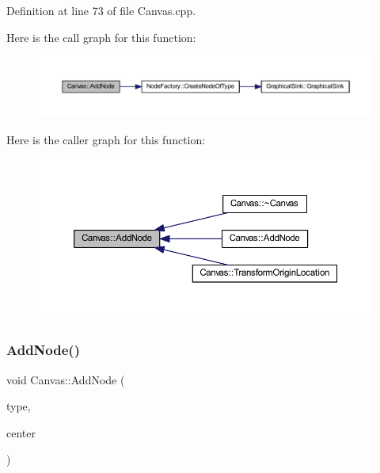 Definition at line 73 of file Canvas.\+cpp.

Here is the call graph for this function\+:
\nopagebreak
\begin{figure}[H]
\begin{center}
\leavevmode
\includegraphics[width=350pt]{class_canvas_aec9038762b17b62ff6126bd6277a9cd8_cgraph}
\end{center}
\end{figure}
Here is the caller graph for this function\+:
\nopagebreak
\begin{figure}[H]
\begin{center}
\leavevmode
\includegraphics[width=350pt]{class_canvas_aec9038762b17b62ff6126bd6277a9cd8_icgraph}
\end{center}
\end{figure}
\mbox{\label{class_canvas_aaec53b68c7b24704e399b565731ed545}} 
\subsubsection{\texorpdfstring{Add\+Node()}{AddNode()}\hspace{0.1cm}{\footnotesize\ttfamily [2/2]}}
{\footnotesize\ttfamily void Canvas\+::\+Add\+Node (\begin{DoxyParamCaption}\item[{\hyperlink{class_generic_node_a9e7985ab9bbfa1c85091adc0ab71a6b6}{Generic\+Node\+::\+Type}}]{type,  }\item[{wx\+Point2\+D\+Double}]{center }\end{DoxyParamCaption})}



